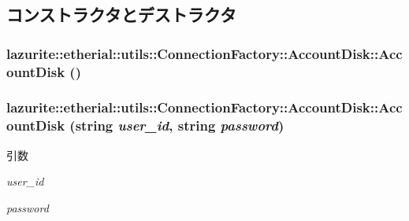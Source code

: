 \subsection{コンストラクタとデストラクタ}
\hypertarget{classlazurite_1_1etherial_1_1utils_1_1_connection_factory_1_1_account_disk_a4abd4052c0489a6d9547ccdba3710cd0}{
\subsubsection[{AccountDisk}]{\setlength{\rightskip}{0pt plus 5cm}lazurite::etherial::utils::ConnectionFactory::AccountDisk::AccountDisk ()}}
\label{classlazurite_1_1etherial_1_1utils_1_1_connection_factory_1_1_account_disk_a4abd4052c0489a6d9547ccdba3710cd0}
\hypertarget{classlazurite_1_1etherial_1_1utils_1_1_connection_factory_1_1_account_disk_a06d8be05653afe18c1d6860c7c2cb99a}{
\subsubsection[{AccountDisk}]{\setlength{\rightskip}{0pt plus 5cm}lazurite::etherial::utils::ConnectionFactory::AccountDisk::AccountDisk (string {\em user\_\-id}, \/  string {\em password})}}
\label{classlazurite_1_1etherial_1_1utils_1_1_connection_factory_1_1_account_disk_a06d8be05653afe18c1d6860c7c2cb99a}

\begin{DoxyParams}{引数}
\item[{\em user\_\-id}]\item[{\em password}]\end{DoxyParams}


